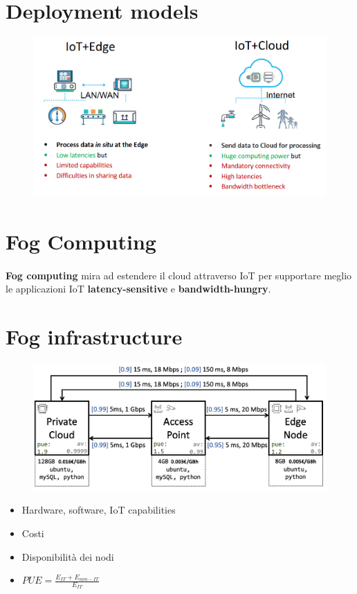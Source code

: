 \documentclass[a4paper, 12pt]{report}
\begin{document}
        \section{Deployment models}
        \begin{figure}[htbp]
          \centering
          \includegraphics[scale=0.4]{Immagini/DeploymentModels.png}
        \end{figure}
        \section{Fog Computing}
        \paragraph{}\textbf{Fog computing} mira ad estendere il cloud attraverso IoT per supportare meglio le applicazioni IoT \textbf{latency-sensitive} e \textbf{bandwidth-hungry}.
        \section{Fog infrastructure}
        \begin{figure}[htbp]
          \centering
          \includegraphics[scale=0.5]{Immagini/FogInfrastructure.png}
        \end{figure}
        \begin{itemize}
          \item Hardware, software, IoT capabilities
          \item Costi
          \item Disponibilità dei nodi
          \item $PUE=\frac{E_{IT}+E_{non-IT}}{E_{IT}}$
        \end{itemize}
\end{document}
